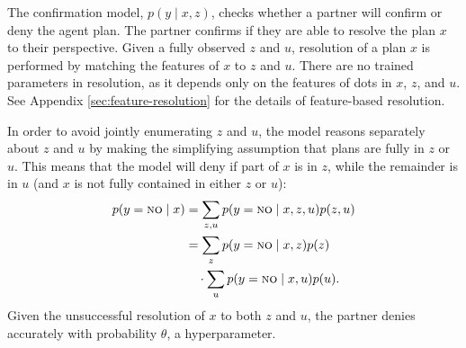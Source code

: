 \documentclass[11pt]{article}
\newcommand{\justin}[1]{{{\textcolor{purple}{(Justin: #1)}}}}
\newcommand{\daniel}[1]{{{\textcolor{red}{(Daniel: #1)}}}}
\begin{document}

The confirmation model, $p(y \mid x,z)$, checks whether a partner will confirm or deny the agent plan. The partner confirms if they are able to resolve the plan $x$ to their perspective. Given a fully observed $z$ and $u$, resolution of a plan $x$ is performed by matching the features of $x$ to $z$ and $u$.
There are no trained parameters in resolution, as it depends only on the features of dots in $x$, $z$, and $u$.
See Appendix \ref{sec:feature-resolution} for the details of feature-based resolution.

In order to avoid jointly enumerating $z$ and $u$, the model reasons separately about $z$ and $u$ by making the simplifying assumption that plans are fully in $z$ or $u$.
This means that the model will deny if part of $x$ is in $z$, while the remainder is in $u$ (and $x$ is not fully contained in either $z$ or $u$):
\begin{align*}
p(y=\textsc{no}\mid x) &=\sum_{z,u} p(y=\textsc{no} \mid x, z, u)p(z,u)\\
&=\sum_z p(y=\textsc{no}\mid x, z )p(z)\\
&\quad \cdot \sum_u p(y=\textsc{no}\mid  x, u )p(u).
\end{align*}
Given the unsuccessful resolution of $x$ to both $z$ and $u$, the partner denies accurately with probability $\theta$, a hyperparameter.

\end{document}
